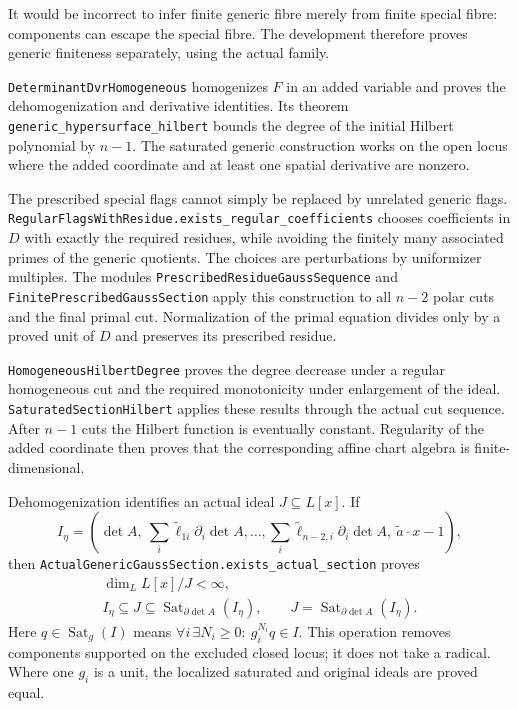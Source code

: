 It would be incorrect to infer finite generic fibre merely from finite
special fibre: components can escape the special fibre.  The development
therefore proves generic finiteness separately, using the actual family.

\nolinkurl{DeterminantDvrHomogeneous} homogenizes $F$ in an added variable
and proves the dehomogenization and derivative identities.  Its theorem
\nolinkurl{generic_hypersurface_hilbert} bounds the degree of the initial
Hilbert polynomial by $n-1$.  The saturated generic construction works on
the open locus where the added coordinate and at least one spatial
derivative are nonzero.

The prescribed special flags cannot simply be replaced by unrelated
generic flags.  \nolinkurl{RegularFlagsWithResidue.exists_regular_coefficients}
chooses coefficients in $D$ with exactly the required residues, while
avoiding the finitely many associated primes of the generic quotients.
The choices are perturbations by uniformizer multiples.  The modules
\nolinkurl{PrescribedResidueGaussSequence} and
\nolinkurl{FinitePrescribedGaussSection} apply this construction to all
$n-2$ polar cuts and the final primal cut.  Normalization of the primal
equation divides only by a proved unit of $D$ and preserves its prescribed
residue.

\nolinkurl{HomogeneousHilbertDegree} proves the degree decrease under a
regular homogeneous cut and the required monotonicity under enlargement
of the ideal.  \nolinkurl{SaturatedSectionHilbert} applies these results
through the actual cut sequence.  After $n-1$ cuts the Hilbert function is
eventually constant.  Regularity of the added coordinate then proves that
the corresponding affine chart algebra is finite-dimensional.

Dehomogenization identifies an actual ideal $J\subseteq L[x]$.  If
\[
 I_\eta=\left(\det A,\
 \sum_i\widetilde\ell_{1i}\partial_i\det A,\ldots,
 \sum_i\widetilde\ell_{n-2,i}\partial_i\det A,\
 \widetilde a\cdot x-1\right),
\]
then \nolinkurl{ActualGenericGaussSection.exists_actual_section} proves
\begin{gather*}
 \dim_L L[x]/J<\infty,\\
 I_\eta\subseteq J\subseteq
 \operatorname{Sat}_{\partial\det A}(I_\eta),\qquad
 J=\operatorname{Sat}_{\partial\det A}(I_\eta).
\end{gather*}
Here $q\in\operatorname{Sat}_{g}(I)$ means
$\forall i\,\exists N_i\geq0:\ g_i^{N_i}q\in I$.  This operation removes
components supported on the excluded closed locus; it does not take a
radical.  Where one $g_i$ is a unit, the localized saturated and original
ideals are proved equal.

